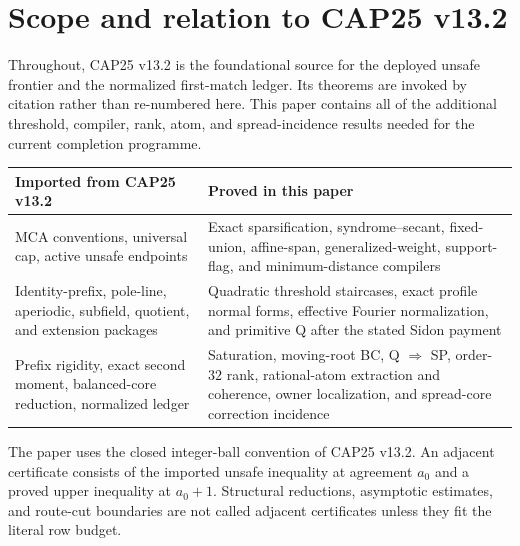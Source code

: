 \documentclass[11pt,a4paper]{amsart}
\numberwithin{equation}{section}
\theoremstyle{remark}
\begin{document}
\section{Scope and relation to CAP25 v13.2}\label{sec:relation-v132}
Throughout, CAP25 v13.2 \cite{CAP25v132} is the foundational source for the deployed unsafe frontier and the normalized first-match ledger.  Its theorems are invoked by citation rather than re-numbered here.  This paper contains all of the additional threshold, compiler, rank, atom, and spread-incidence results needed for the current completion programme.

\begin{center}
\begin{tabular}{@{}>{\raggedright\arraybackslash}p{}>{\raggedright\arraybackslash}p{}@{}}
\toprule
Imported from CAP25 v13.2 & Proved in this paper\\
\midrule
MCA conventions, universal cap, active unsafe endpoints & Exact sparsification, syndrome--secant, fixed-union, affine-span, generalized-weight, support-flag, and minimum-distance compilers\\
Identity-prefix, pole-line, aperiodic, subfield, quotient, and extension packages & Quadratic threshold staircases, exact profile normal forms, effective Fourier normalization, and primitive Q after the stated Sidon payment\\
Prefix rigidity, exact second moment, balanced-core reduction, normalized ledger & Saturation, moving-root BC, Q $\Rightarrow$ SP, order-$32$ rank, rational-atom extraction and coherence, owner localization, and spread-core correction incidence\\
\bottomrule
\end{tabular}
\end{center}

The paper uses the closed integer-ball convention of CAP25 v13.2.  An adjacent certificate consists of the imported unsafe inequality at agreement $a_0$ and a proved upper inequality at $a_0+1$.  Structural reductions, asymptotic estimates, and route-cut boundaries are not called adjacent certificates unless they fit the literal row budget.
\end{document}
